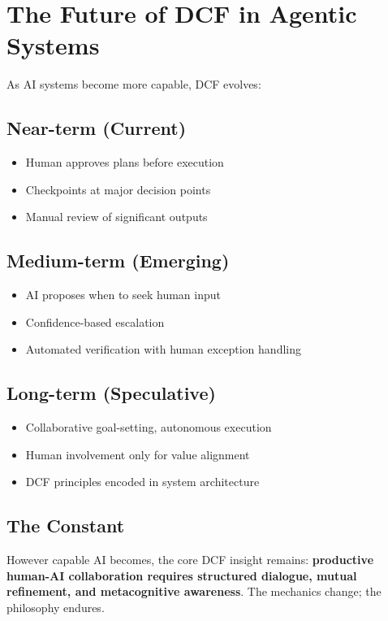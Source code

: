 \chapter{The Future of DCF in Agentic Systems}

As AI systems become more capable, DCF evolves:

\section{Near-term (Current)}

\begin{itemize}
    \item Human approves plans before execution
    \item Checkpoints at major decision points
    \item Manual review of significant outputs
\end{itemize}

\section{Medium-term (Emerging)}

\begin{itemize}
    \item AI proposes when to seek human input
    \item Confidence-based escalation
    \item Automated verification with human exception handling
\end{itemize}

\section{Long-term (Speculative)}

\begin{itemize}
    \item Collaborative goal-setting, autonomous execution
    \item Human involvement only for value alignment
    \item DCF principles encoded in system architecture
\end{itemize}

\section{The Constant}

However capable AI becomes, the core DCF insight remains: \textbf{productive human-AI collaboration requires structured dialogue, mutual refinement, and metacognitive awareness}. The mechanics change; the philosophy endures.


